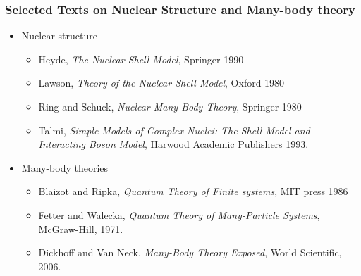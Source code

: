 \documentclass{beamer}
\begin{document}
\begin{frame}
\frametitle{Selected Texts on Nuclear Structure and Many-body theory}

\begin{block}{}
\begin{itemize}
\item Nuclear structure
\begin{itemize}

 \item Heyde, \emph{The Nuclear Shell Model}, Springer 1990

 \item Lawson, \emph{Theory of the Nuclear Shell Model}, Oxford 1980

 \item Ring and Schuck, \emph{Nuclear Many-Body Theory}, Springer 1980

 \item Talmi, \emph{Simple Models of Complex Nuclei: The Shell Model and Interacting Boson Model}, Harwood Academic Publishers 1993.

\end{itemize}

\noindent
\item Many-body theories
\begin{itemize}

 \item Blaizot and Ripka, \emph{Quantum Theory of Finite systems}, MIT press 1986

 \item Fetter and Walecka, \emph{Quantum Theory of Many-Particle Systems}, McGraw-Hill, 1971.

 \item Dickhoff and Van Neck, \emph{Many-Body Theory Exposed}, World Scientific, 2006.
\end{itemize}

\noindent
\end{itemize}

\noindent
\end{block}
\end{frame}
\end{document}
